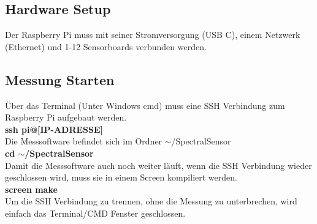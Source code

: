 \subsection{Hardware Setup}
Der Raspberry Pi muss mit seiner Stromversorgung (USB C), einem  Netzwerk (Ethernet) und 1-12 Sensorboards verbunden werden.
\subsection{Messung Starten}
Über das Terminal (Unter Windows cmd) muss eine SSH Verbindung zum Raspberry Pi aufgebaut werden.\\
\textbf{ssh pi@[IP-ADRESSE]}\\
Die Messsoftware befindet sich im Ordner $\sim$/SpectralSensor\\
\textbf{cd  $\sim$/SpectralSensor}\\
Damit die Messsoftware auch noch weiter läuft, wenn die SSH Verbindung wieder geschlossen wird, muss sie in einem Screen kompiliert werden.\\
\textbf{screen make}\\
Um die SSH Verbindung zu trennen, ohne die Messung zu unterbrechen, wird einfach das Terminal/CMD Fenster geschlossen.\smallskip

